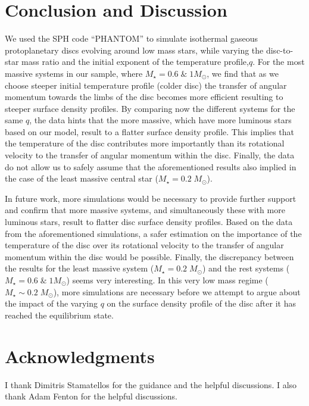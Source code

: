 \documentclass[aps,prb,twocolumn,superscriptaddress,floatfix,longbibliography]{revtex4-2}
\begin{document}
\section{Conclusion and Discussion}
We used the SPH code ``PHANTOM'' to simulate isothermal gaseous protoplanetary discs evolving around low mass stars, while varying the disc-to-star mass ratio and the initial exponent of the temperature profile,$q$. For the most massive systems in our sample, where $M_{\star} = 0.6 \; \& \; 1 M_{\odot}$, we find that as we choose steeper initial temperature profile (colder disc) the transfer of angular momentum towards the limbs of the disc becomes more efficient resulting to steeper surface density profiles. By comparing now the different systems for the same $q$, the data hints that the more massive, which have more luminous stars based on our model, result to a flatter surface density profile. This implies that the temperature of the disc contributes more importantly than its rotational velocity to the transfer of angular momentum within the disc. Finally, the data do not allow us to safely assume that the aforementioned results also implied in the case of the least massive central star ($M_{\star} = 0.2 \;  M_{\odot}$).

In future work, more simulations would be necessary to provide further support and confirm that more massive systems, and simultaneously these with more luminous stars, result to flatter disc surface density profiles. Based on the data from the aforementioned simulations, a safer estimation on the importance of the temperature of the disc over its rotational velocity to the transfer of angular momentum within the disc would be possible. Finally, the discrepancy between the results for the least massive system ($M_{\star} = 0.2 \;  M_{\odot}$) and the rest systems ($M_{\star} = 0.6 \; \& \; 1 M_{\odot}$) seems very interesting. In this very low mass regime ($M_{\star} \sim 0.2 \;  M_{\odot}$), more simulations are necessary before we attempt to argue about the impact of the varying $q$ on the surface density profile of the disc after it has reached the equilibrium state.\par

\section{Acknowledgments}
I thank Dimitris Stamatellos for the guidance and the helpful discussions. I also thank Adam Fenton for the helpful discussions.
\end{document}
